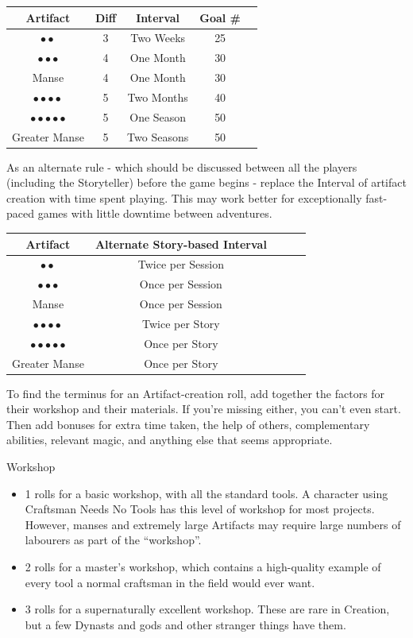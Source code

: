 \documentclass[oneside]{book}
\begin{document}
\begin{multicols}{2}
  \begin{tabular}{ccccc}
    Artifact & Diff & Interval & Goal \# \\
  \hline
    \(\bullet\bullet\) & 3 & Two Weeks & 25 \\
    \(\bullet\bullet\bullet\) & 4 & One Month & 30 \\
    Manse & 4 & One Month & 30\\
    \(\bullet\bullet\bullet\bullet\) & 5 & Two Months & 40 \\
    \(\bullet\bullet\bullet\bullet\bullet\) & 5 & One Season & 50 \\
    Greater Manse & 5 & Two Seasons & 50 \\
  \end{tabular}

  \par As an alternate rule - which should be discussed between all the players (including the Storyteller) before the game begins - replace the Interval of artifact creation with time spent playing. This may work better for exceptionally fast-paced games with little downtime between adventures.

  \begin{tabular}{ccccc}
    Artifact & Alternate Story-based Interval \\
  \hline
    \(\bullet\bullet\) & Twice per Session \\
    \(\bullet\bullet\bullet\) & Once per Session \\
    Manse & Once per Session \\
    \(\bullet\bullet\bullet\bullet\) & Twice per Story \\
    \(\bullet\bullet\bullet\bullet\bullet\) & Once per Story \\
    Greater Manse & Once per Story \\
  \end{tabular}

  \par To find the terminus for an Artifact-creation roll, add together the factors for their workshop and their materials. If you're missing either, you can't even start. Then add bonuses for extra time taken, the help of others, complementary abilities, relevant magic, and anything else that seems appropriate.

  Workshop
  \begin{itemize}
    \item 1 rolls for a basic workshop, with all the standard tools. A character using Craftsman Needs No Tools has this level of workshop for most projects. However, manses and extremely large Artifacts may require large numbers of labourers as part of the “workshop”.
    \item 2 rolls for a master's workshop, which contains a high-quality example of every tool a normal craftsman in the field would ever want.
    \item 3 rolls for a supernaturally excellent workshop. These are rare in Creation, but a few Dynasts and gods and other stranger things have them.
  \end{itemize}


\end{multicols}
\end{document}
